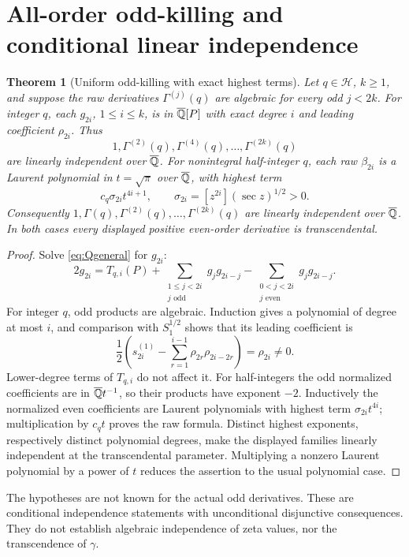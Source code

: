 \documentclass[11pt,a4paper]{article}
\newtheorem{theorem}{Theorem}[section]
\theoremstyle{definition}\newtheorem{definition}[theorem]{Definition}
\theoremstyle{remark}\newtheorem{remark}[theorem]{Remark}
\begin{document}
\section{All-order odd-killing and conditional linear independence}\label{sec:odd}
\begin{theorem}[Uniform odd-killing with exact highest terms]\label{thm:odd}
Let $q\in\mathcal H$, $k\ge1$, and suppose the raw derivatives $\Gamma^{(j)}(q)$ are algebraic for every odd $j<2k$.
For integer $q$, each $g_{2i}$, $1\le i\le k$, is in $\overline{\mathbb Q}[P]$ with exact degree $i$ and leading coefficient $\rho_{2i}$. Thus
\[
1,\Gamma^{(2)}(q),\Gamma^{(4)}(q),\ldots,\Gamma^{(2k)}(q)
\]
are linearly independent over $\overline{\mathbb Q}$.
For nonintegral half-integer $q$, each raw $\beta_{2i}$ is a Laurent polynomial in $t=\sqrt\pi$ over $\overline{\mathbb Q}$, with highest term
\[
c_q\sigma_{2i}t^{4i+1},\qquad \sigma_{2i}=[z^{2i}](\sec z)^{1/2}>0.
\]
Consequently $1,\Gamma(q),\Gamma^{(2)}(q),\ldots,\Gamma^{(2k)}(q)$ are linearly independent over $\overline{\mathbb Q}$. In both cases every displayed positive even-order derivative is transcendental.
\end{theorem}
\begin{proof}
Solve \eqref{eq:Qgeneral} for $g_{2i}$:
\[
2g_{2i}=T_{q,i}(P)+\sum_{\substack{1\le j<2i\\j\text{ odd}}}g_jg_{2i-j}
-\sum_{\substack{0<j<2i\\j\text{ even}}}g_jg_{2i-j}.
\]
For integer $q$, odd products are algebraic. Induction gives a polynomial of degree at most $i$, and comparison with $S_1^{1/2}$ shows that its leading coefficient is
\[
\frac12\left(s_{2i}^{(1)}-\sum_{r=1}^{i-1}\rho_{2r}\rho_{2i-2r}\right)=\rho_{2i}\ne0.
\]
Lower-degree terms of $T_{q,i}$ do not affect it. For half-integers the odd normalized coefficients are in $\overline{\mathbb Q} t^{-1}$, so their products have exponent $-2$. Inductively the normalized even coefficients are Laurent polynomials with highest term $\sigma_{2i}t^{4i}$; multiplication by $c_qt$ proves the raw formula. Distinct highest exponents, respectively distinct polynomial degrees, make the displayed families linearly independent at the transcendental parameter. Multiplying a nonzero Laurent polynomial by a power of $t$ reduces the assertion to the usual polynomial case.
\end{proof}
The hypotheses are not known for the actual odd derivatives. These are conditional independence statements with unconditional disjunctive consequences. They do not establish algebraic independence of zeta values, nor the transcendence of $\gamma$.
\end{document}
